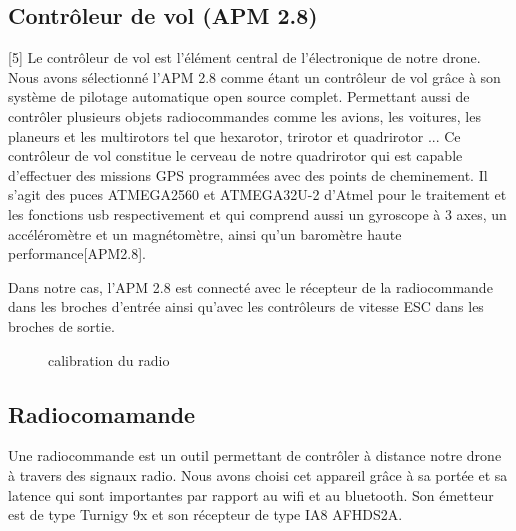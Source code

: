 	\subsection {Contrôleur de vol (APM 2.8)}[5]
	Le contrôleur de vol est l'élément central de l'électronique de notre drone.
	Nous avons sélectionné l’APM 2.8 comme étant un contrôleur de vol grâce à son système de pilotage automatique open source complet. Permettant aussi de contrôler plusieurs objets radiocommandes comme les avions, les voitures, les planeurs et les multirotors tel que hexarotor, trirotor et quadrirotor ...
	Ce contrôleur de vol constitue le cerveau de notre quadrirotor qui est capable d'effectuer des missions GPS programmées avec des points de cheminement. Il s’agit des puces ATMEGA2560 et ATMEGA32U-2 d'Atmel pour le traitement et les fonctions usb respectivement et qui comprend aussi un gyroscope à 3 axes, un accéléromètre et un magnétomètre, ainsi qu'un baromètre haute performance[APM2.8].
	
	Dans notre cas, l’APM 2.8 est connecté avec le récepteur de la radiocommande dans les broches d’entrée ainsi qu'avec les contrôleurs de vitesse ESC dans les broches de sortie. 
	
	\begin{figure} [h]
		\begin{center}
			\centering
		\end{center}
		\caption{calibration du radio}
	\end{figure}
	\newpage
	\subsection {Radiocomamande}
	Une radiocommande est un outil permettant de contrôler à distance notre drone à travers des signaux radio. Nous avons choisi cet appareil grâce à sa portée et sa latence qui sont importantes par rapport au wifi et au bluetooth. Son émetteur est de type Turnigy 9x et son récepteur de type IA8 AFHDS2A.
	
